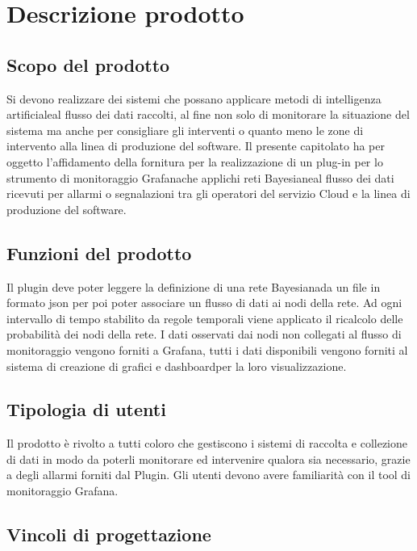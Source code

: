 \section{Descrizione prodotto}
		\subsection{Scopo del prodotto}			
Si devono realizzare dei sistemi che possano applicare metodi di intelligenza artificiale\pedice al flusso dei dati raccolti, al fine non solo di monitorare la situazione del sistema ma anche per consigliare gli interventi o quanto meno le zone di intervento alla linea di produzione del software.
Il presente capitolato ha per oggetto l'affidamento della fornitura per la
realizzazione di un plug-in per lo strumento di monitoraggio Grafana\pedice che
applichi reti Bayesiane\pedice al flusso dei dati ricevuti per allarmi o segnalazioni tra gli operatori del servizio Cloud e la linea di produzione del software.


		\subsection{Funzioni del prodotto}
Il plugin deve poter leggere la definizione di una rete Bayesiana\pedice da un file in formato json per poi poter associare un flusso di dati ai nodi della rete. Ad ogni intervallo di tempo stabilito da regole temporali viene applicato il ricalcolo delle probabilità dei nodi della rete. I dati osservati dai nodi non collegati al flusso di monitoraggio vengono forniti a Grafana\pedice, tutti i dati disponibili vengono forniti al sistema di creazione di grafici e dashboard\pedice per la loro visualizzazione.


		\subsection{Tipologia di utenti}

Il prodotto è rivolto a tutti coloro che gestiscono i sistemi di raccolta e collezione di dati in modo da poterli monitorare ed intervenire qualora sia necessario, grazie a degli allarmi forniti dal Plugin.
Gli utenti devono avere familiarità  con il tool di monitoraggio Grafana.


		\subsection{Vincoli di progettazione}
